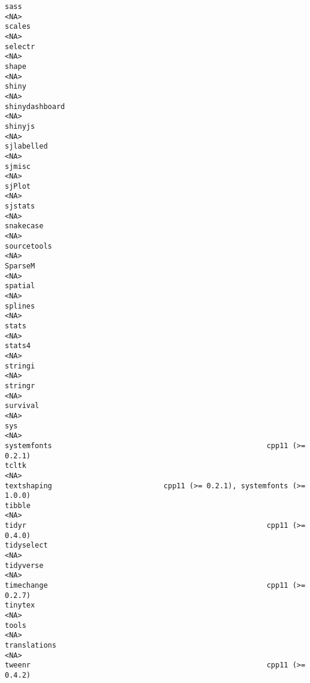 \documentclass[
  letterpaper,
  DIV=11,
  numbers=noendperiod]{scrreprt}
\begin{document}
\begin{verbatim}
sass                                                                     <NA>
scales                                                                   <NA>
selectr                                                                  <NA>
shape                                                                    <NA>
shiny                                                                    <NA>
shinydashboard                                                           <NA>
shinyjs                                                                  <NA>
sjlabelled                                                               <NA>
sjmisc                                                                   <NA>
sjPlot                                                                   <NA>
sjstats                                                                  <NA>
snakecase                                                                <NA>
sourcetools                                                              <NA>
SparseM                                                                  <NA>
spatial                                                                  <NA>
splines                                                                  <NA>
stats                                                                    <NA>
stats4                                                                   <NA>
stringi                                                                  <NA>
stringr                                                                  <NA>
survival                                                                 <NA>
sys                                                                      <NA>
systemfonts                                                  cpp11 (>= 0.2.1)
tcltk                                                                    <NA>
textshaping                          cpp11 (>= 0.2.1), systemfonts (>= 1.0.0)
tibble                                                                   <NA>
tidyr                                                        cpp11 (>= 0.4.0)
tidyselect                                                               <NA>
tidyverse                                                                <NA>
timechange                                                   cpp11 (>= 0.2.7)
tinytex                                                                  <NA>
tools                                                                    <NA>
translations                                                             <NA>
tweenr                                                       cpp11 (>= 0.4.2)

\end{verbatim}
\end{document}
